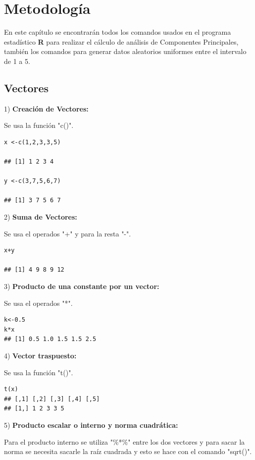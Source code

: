 \documentclass[12pt,letterpaper]{report} %
\begin{document}
\chapter{Metodología}

En este capítulo se encontrarán todos los comandos usados en el programa estadístico \textbf{R} para realizar el cálculo de análisis de Componentes Principales, también los comandos para generar datos aleatorios uniformes entre el intervalo de 1 a 5. 

\section{Vectores}

1) \textbf{Creación de Vectores:}

Se usa la función "c()".

\begin{lstlisting}
x <-c(1,2,3,3,5)

## [1] 1 2 3 4

y <-c(3,7,5,6,7)

## [1] 3 7 5 6 7
\end{lstlisting}

2) \textbf{Suma de Vectores:}

Se usa el operados "+" y para la resta "-".

\begin{lstlisting}
x+y

## [1] 4 9 8 9 12
\end{lstlisting}

3) \textbf{Producto de una constante por un vector:}

Se usa el operados "*".

\begin{lstlisting}
k<-0.5
k*x
## [1] 0.5 1.0 1.5 1.5 2.5
\end{lstlisting}

4) \textbf{Vector traspuesto:}

Se usa la función "t()".

\begin{lstlisting}
t(x) 
## [,1] [,2] [,3] [,4] [,5]
## [1,] 1 2 3 3 5
\end{lstlisting}

5) \textbf{Producto escalar o interno y norma cuadrática:}

Para el producto interno se utiliza "\%*\%" entre los dos vectores y para sacar la norma se necesita sacarle la raíz cuadrada y esto se hace con el comando "sqrt()".
\end{document}

